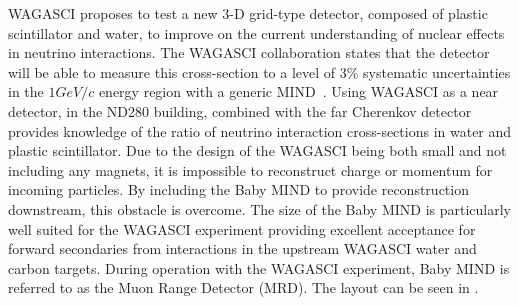 WAGASCI proposes to test a new 3-D grid-type detector, composed of plastic scintillator and water, to improve on the current understanding of nuclear effects in neutrino interactions. The WAGASCI collaboration states that the detector will be able to measure this cross-section to a level of 3\% systematic uncertainties in the $1 GeV/c$ energy region with a generic MIND~\cite{30WAGASCI}. %
Using WAGASCI as a near detector, in the ND280 building, combined with the far Cherenkov detector provides knowledge of the ratio of neutrino interaction cross-sections in water and plastic scintillator. Due to the design of the WAGASCI being both small and not including any magnets, it is impossible to reconstruct charge or momentum for incoming particles. By including the Baby MIND to provide reconstruction downstream, this obstacle is overcome. The size of the Baby MIND is particularly well suited for the WAGASCI experiment providing excellent acceptance for forward secondaries from interactions in the upstream WAGASCI water and carbon targets. During operation with the WAGASCI experiment, Baby MIND is referred to as the Muon Range Detector (MRD). The layout can be seen in .




